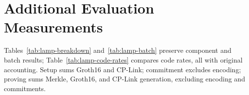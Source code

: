 \section{Additional Evaluation Measurements}
\label{app:lamp-code-rates}
\label{app:component-batch}

Tables~\ref{tab:lamp-breakdown} and~\ref{tab:lamp-batch} preserve component and
batch results; Table~\ref{tab:lamp-code-rates} compares code rates, all with
original accounting. Setup sums Groth16 and CP-Link; commitment excludes
encoding; proving sums Merkle, Groth16, and CP-Link generation, excluding
encoding and commitments.
